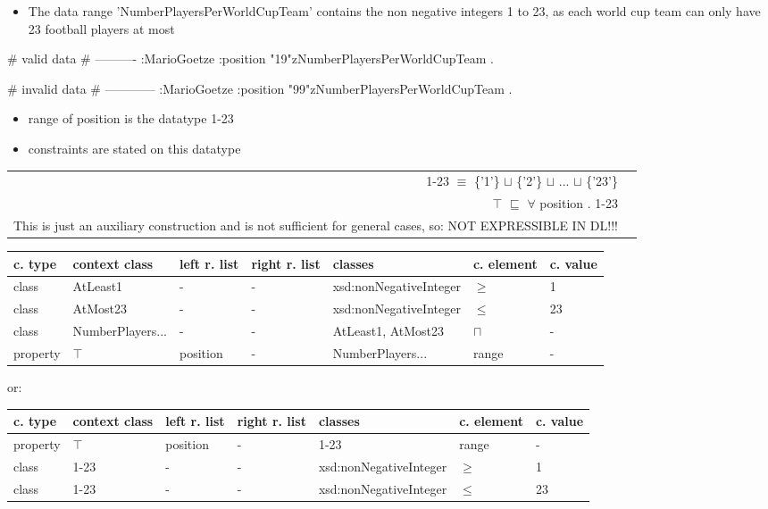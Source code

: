 \documentclass{llncs}
\newenvironment{gcotable}{
  \scriptsize
  \sffamily
  \vspace{0.3cm}
	\begin{center}
  \begin{tabular}{l|l|l|l|l|l|l}
  \hline
  \textbf{c. type} & \textbf{context class} & \textbf{left r. list} & \textbf{right r. list} & \textbf{classes} & \textbf{c. element} & \textbf{c. value} \\
  \hline

}{
  \hline
  \end{tabular}
	\end{center}
}
\newenvironment{DL}{
	\begin{center}
  \begin{tabular}{r l}

}{
  \end{tabular}
	\end{center}
}
\begin{document}
\begin{itemize}
	\item The data range 'NumberPlayersPerWorldCupTeam' contains the non negative integers 1 to 23, as each world cup team can only have 23 football players at most
\end{itemize}

\begin{ex}
# valid data
# ----------
:MarioGoetze
    :position "19"^^:NumberPlayersPerWorldCupTeam .
\end{ex}

\begin{ex}
# invalid data
# ------------
:MarioGoetze
    :position "99"^^:NumberPlayersPerWorldCupTeam .
\end{ex}

\begin{itemize}
	\item range of position is the datatype 1-23
  \item constraints are stated on this datatype
\end{itemize}

\begin{DL}
1-23 $\equiv$ \{'1'\} $\sqcup$ \{'2'\} $\sqcup$ ... $\sqcup$ \{'23'\} \\
$\top$ $\sqsubseteq$ $\forall$ position . 1-23 \\
This is just an auxiliary construction and is not sufficient for general cases, so: NOT EXPRESSIBLE IN DL!!!
\end{DL}

\begin{gcotable}
class & AtLeast1 & - & - & xsd:nonNegativeInteger & $\geq$ & 1 \\
class & AtMost23 & - & - & xsd:nonNegativeInteger & $\leq$ & 23 \\
class & NumberPlayers... & - & - & AtLeast1, AtMost23 & $\sqcap$ & - \\
property & $\top$ & position & - & NumberPlayers... & range & - \\
\end{gcotable}

or:

\begin{gcotable}
property & $\top$ & position & - & 1-23 & range & - \\
class & 1-23 & - & - & xsd:nonNegativeInteger & $\geq$ & 1 \\
class & 1-23 & - & - & xsd:nonNegativeInteger & $\leq$ & 23 \\
\end{gcotable}
\end{document}
